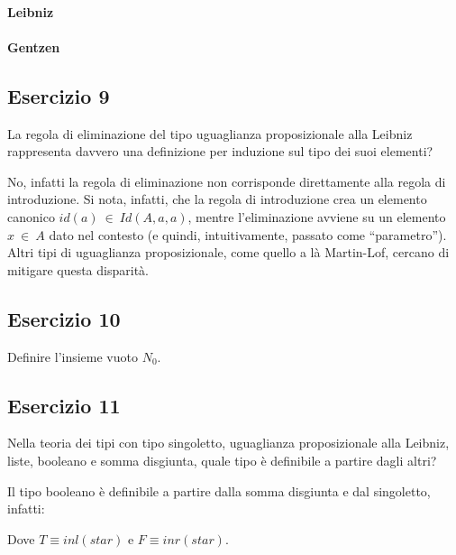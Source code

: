 \paragraph{Leibniz}

\paragraph{Gentzen}


\subsection{Esercizio 9}
\begin{thm}
	La regola di eliminazione del tipo uguaglianza proposizionale alla Leibniz rappresenta davvero una definizione per induzione sul tipo dei suoi elementi?
\end{thm}
No, infatti la regola di eliminazione non corrisponde direttamente alla regola di introduzione. Si nota, infatti, che la regola di introduzione crea un elemento canonico $id(a)~\in~Id(A,a,a)$, mentre l'eliminazione avviene su un elemento $x~\in~A$ dato nel contesto (e quindi, intuitivamente, passato come ``parametro''). Altri tipi di uguaglianza proposizionale, come quello a là Martin-Lof, cercano di mitigare questa disparità.

\subsection{Esercizio 10}
\begin{thm}
	Definire l'insieme vuoto $N_0$.
\end{thm}


\subsection{Esercizio 11}
\begin{thm}
	Nella teoria dei tipi con tipo singoletto, uguaglianza proposizionale alla Leibniz, liste, booleano e somma disgiunta, quale tipo è definibile a partire dagli altri?
\end{thm}
Il tipo booleano è definibile a partire dalla somma disgiunta e dal singoletto, infatti:

Dove $T \equiv inl (star)$ e $F \equiv inr (star)$.
